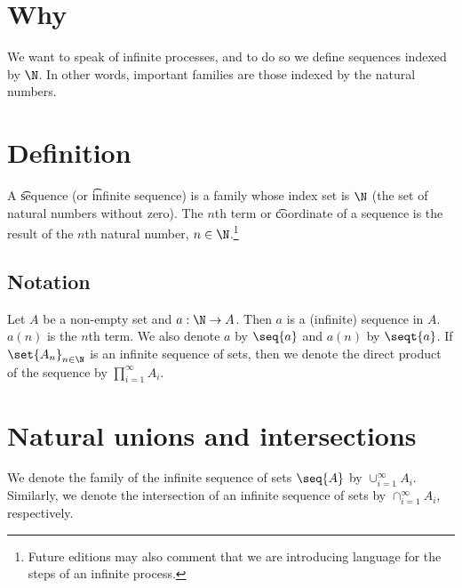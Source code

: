 

\section*{Why}

We want to speak of infinite processes, and to do so we define sequences indexed by $\N  $.
In other words, important families are those indexed by the natural numbers.

\section*{Definition}

A \t{sequence} (or \t{infinite sequence}) is a family whose index set is $\N  $ (the set of natural numbers without zero).
The \t{$n$th term} or \t{coordinate} of a sequence is the result of the $n$th natural number, $n \in \N  $.\footnote{Future editions may also comment that we are introducing language for the steps of an infinite process.}

\subsection*{Notation}

Let $A$ be a non-empty set and $a: \N   \to A$.
Then $a$ is a (infinite) sequence in $A$.
$a(n)$ is the $n$th term.
We also denote $a$ by $\seq{a}$ and $a(n)$ by $\seqt{a}$.
If $\set{A_n}_{n \in \N  }$ is an infinite sequence of sets, then we denote the direct product of the sequence by $\prod_{i = 1}^{\infty} A_i$.

\section*{Natural unions and intersections}

We denote the family of the infinite sequence of sets $\seq{A}$ by $\cup_{i = 1}^{\infty} A_i$.
Similarly, we denote the intersection of an infinite sequence of sets by $\cap _{i = 1}^{\infty} A_i$, respectively.

\blankpage